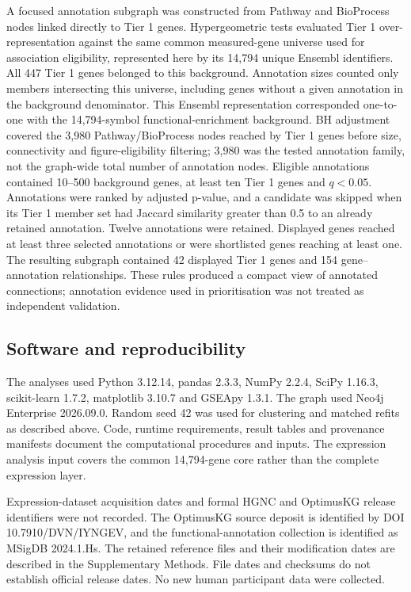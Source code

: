 \documentclass[11pt,a4paper]{article}
\begin{document}
A focused annotation subgraph was constructed from Pathway and BioProcess nodes linked directly to Tier 1 genes. Hypergeometric tests evaluated Tier 1 over-representation against the same common measured-gene universe used for association eligibility, represented here by its 14,794 unique Ensembl identifiers. All 447 Tier 1 genes belonged to this background. Annotation sizes counted only members intersecting this universe, including genes without a given annotation in the background denominator. This Ensembl representation corresponded one-to-one with the 14,794-symbol functional-enrichment background. BH adjustment covered the 3,980 Pathway/BioProcess nodes reached by Tier 1 genes before size, connectivity and figure-eligibility filtering; 3,980 was the tested annotation family, not the graph-wide total number of annotation nodes. Eligible annotations contained 10--500 background genes, at least ten Tier 1 genes and \(q<0.05\). Annotations were ranked by adjusted p-value, and a candidate was skipped when its Tier 1 member set had Jaccard similarity greater than 0.5 to an already retained annotation. Twelve annotations were retained. Displayed genes reached at least three selected annotations or were shortlisted genes reaching at least one. The resulting subgraph contained 42 displayed Tier 1 genes and 154 gene--annotation relationships. These rules produced a compact view of annotated connections; annotation evidence used in prioritisation was not treated as independent validation.


\subsection*{Software and reproducibility}
The analyses used Python 3.12.14, pandas 2.3.3, NumPy 2.2.4, SciPy 1.16.3, scikit-learn 1.7.2, matplotlib 3.10.7 and GSEApy 1.3.1. The graph used Neo4j Enterprise 2026.09.0. Random seed 42 was used for clustering and matched refits as described above. Code, runtime requirements, result tables and provenance manifests document the computational procedures and inputs. The expression analysis input covers the common 14,794-gene core rather than the complete expression layer.

Expression-dataset acquisition dates and formal HGNC and OptimusKG release identifiers were not recorded. The OptimusKG source deposit is identified by DOI 10.7910/DVN/IYNGEV, and the functional-annotation collection is identified as MSigDB 2024.1.Hs. The retained reference files and their modification dates are described in the Supplementary Methods. File dates and checksums do not establish official release dates. No new human participant data were collected.
\end{document}
